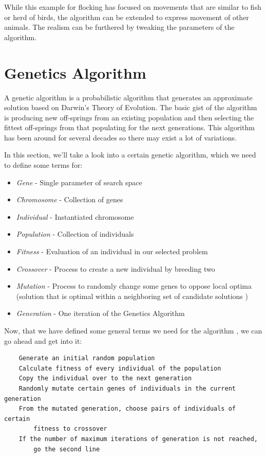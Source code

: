\documentclass[a4paper, 12pt]{book}
\begin{document}
While this example for flocking \cite{FlocksReynolds} has focused on movements that are similar to fish or herd of birds, the algorithm can be extended to express movement of other animals. The realism can be furthered by tweaking the parameters of the algorithm.

\section{Genetics Algorithm}

A genetic algorithm \cite{GameAIGeneticAlg} is a probabilistic algorithm that generates an approximate solution based on Darwin’s Theory of Evolution. The basic gist of the algorithm is producing new off-springs from an existing population and then selecting the fittest off-springs from that populating for the next generations. This algorithm has been around for several decades so there may exist a lot of variations.

In this section, we'll take a look into a certain genetic algorithm, which we need to define some terms for:

\begin{itemize}
    \item \emph{Gene} - Single parameter of search space
    \item \emph{Chromosome} - Collection of genes
    \item \emph{Individual} - Instantiated chromosome
    \item \emph{Population} - Collection of individuals
    \item \emph{Fitness} - Evaluation of an individual in our selected problem
    \item \emph{Crossover} - Process to create a new individual by breeding two
    \item \emph{Mutation} - Process to randomly change some genes to oppose local optima (solution that is optimal within a neighboring set of candidate solutions \cite{LocalOptimum}) 
    \item \emph{Generation} - One iteration of the Genetics Algorithm
\end{itemize}

\clearpage

Now, that we have defined some general terms we need for the algorithm \cite{GameAIGeneticAlg}, we can go ahead and get into it:

\begin{verbatim}
    Generate an initial random population
    Calculate fitness of every individual of the population
    Copy the individual over to the next generation
    Randomly mutate certain genes of individuals in the current generation
    From the mutated generation, choose pairs of individuals of certain 
        fitness to crossover
    If the number of maximum iterations of generation is not reached, 
        go the second line
\end{verbatim}
\end{document}
